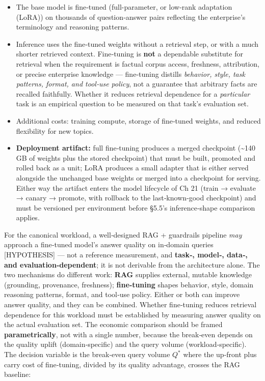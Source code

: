 \begin{itemize}
\tightlist
\item
  The base model is fine‑tuned (full-parameter, or low‑rank adaptation
  (LoRA)) on thousands of question‑answer pairs reflecting the
  enterprise's terminology and reasoning patterns.
\item
  Inference uses the fine‑tuned weights without a retrieval step, or
  with a much shorter retrieved context. Fine‑tuning is \textbf{not} a
  dependable substitute for retrieval when the requirement is factual
  corpus access, freshness, attribution, or precise enterprise knowledge
  --- fine‑tuning distills \emph{behavior, style, task patterns, format,
  and tool‑use policy}, not a guarantee that arbitrary facts are
  recalled faithfully. Whether it reduces retrieval dependence for a
  \emph{particular} task is an empirical question to be measured on that
  task's evaluation set.
\item
  Additional costs: training compute, storage of fine‑tuned weights, and
  reduced flexibility for new topics.
\item
  \textbf{Deployment artifact:} full fine‑tuning produces a merged
  checkpoint (\textasciitilde140 GB of weights plus the stored
  checkpoint) that must be built, promoted and rolled back as a unit;
  LoRA produces a small adapter that is either served alongside the
  unchanged base weights or merged into a checkpoint for serving. Either
  way the artifact enters the model lifecycle of Ch 21 (train → evaluate
  → canary → promote, with rollback to the last‑known‑good checkpoint)
  and must be versioned per environment before §5.5's inference‑shape
  comparison applies.
\end{itemize}

For the canonical workload, a well‑designed RAG + guardrails pipeline
\emph{may} approach a fine‑tuned model's answer quality on in‑domain
queries \mbox{{[}HYPOTHESIS{]}} --- not a reference measurement, and
\textbf{task‑, model‑, data‑, and evaluation‑dependent}; it is not
derivable from the architecture alone. The two mechanisms do different
work: \textbf{RAG} supplies external, mutable knowledge (grounding,
provenance, freshness); \textbf{fine‑tuning} shapes behavior, style,
domain reasoning patterns, format, and tool‑use policy. Either or both
can improve answer quality, and they can be combined. Whether
fine‑tuning reduces retrieval dependence for this workload must be
established by measuring answer quality on the actual evaluation set.
The economic comparison should be framed \textbf{parametrically}, not
with a single number, because the break‑even depends on the quality
uplift (domain‑specific) and the query volume (workload‑specific). The
decision variable is the break‑even query volume \(Q^*\) where the
up‑front plus carry cost of fine‑tuning, divided by its quality
advantage, crosses the RAG baseline:

